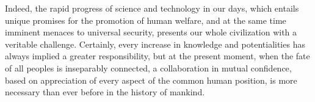 \documentclass{tufte-handout}
\begin{document}
Indeed, the rapid progress of science and technology in our days,
which entails unique promises for the promotion of human welfare, and
at the same time imminent menaces to universal security, presents our
whole civilization with a veritable challenge. Certainly, every
increase in knowledge and potentialities has always implied a greater
responsibility, but at the present moment, when the fate of all
peoples is inseparably connected, a collaboration in mutual
confidence, based on appreciation of every aspect of the common human
position, is more necessary than ever before in the history of
mankind.
\end{document}
